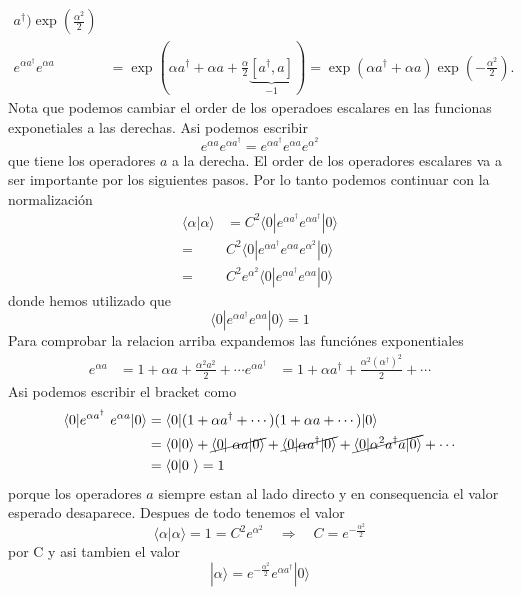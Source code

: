 \begin{solucion}
\begin{align*}
a^\dagger) \exp(\frac{\alpha^2}{2}) \\
	e^{\alpha a^\dagger} e^{\alpha a} &= \exp(\alpha a^\dagger + \alpha a +
\frac{\alpha}{2} \underbrace{[a^\dagger, a]}_{-1}) = \exp(\alpha a^\dagger +
\alpha a) \exp(-\frac{\alpha^2}{2}).
\end{align*}
Nota que podemos cambiar el order de los operadoes escalares en las funcionas
exponetiales a las derechas. Asi podemos escribir
$$
	e^{\alpha a} e^{\alpha a^\dagger} = e^{\alpha a^\dagger} e^{\alpha a}
e^{\alpha^2}
$$
que tiene los operadores $a$ a la derecha. El order de los operadores escalares
va a ser importante por los siguientes pasos. Por lo tanto podemos continuar con
la normalización
\begin{align*}
	\langle \alpha | \alpha \rangle &= C^2 \langle 0 | e^{\alpha a^\dagger}
e^{\alpha a^\dagger} | 0\rangle \\
	=& C^2 \langle 0 | e^{\alpha a^\dagger} e^{\alpha a} e^{\alpha^2} | 0\rangle
\\
	=& C^2 e^{\alpha^2} \langle 0| e^{\alpha a^\dagger} e^{\alpha a} | 0\rangle
\end{align*}
donde hemos utilizado que 
$$
	\langle 0 | e^{\alpha a^\dagger} e^{\alpha a} | 0\rangle = 1
$$
Para comprobar la relacion arriba expandemos las funciónes exponentiales
\begin{align*}
	e^{\alpha a} &= 1 + \alpha a + \frac{\alpha^2 a^2}{2} + \cdots 
	e^{\alpha a^\dagger} &= 1 + \alpha a^\dagger + \frac{\alpha^2
(\alpha^\dagger)^2}{2} + \cdots
\end{align*}
Asi podemos escribir el bracket como 
\begin{align*}
	\langle 0 | e^{\alpha a^\dagger} e^{\alpha a} | 0\rangle &= \langle 0 | ( 1 +
\alpha a^\dagger + \cdots)(1 + \alpha a + \cdots ) | 0 \rangle \\
	&= \langle 0 | 0 \rangle + \cancel{\langle 0 | \alpha a | 0 \rangle} +
\cancel{\langle 0 | \alpha a^\dagger | 0 \rangle} + \cancel{\langle 0 | \alpha^2
a^\dagger a | 0\rangle} + \cdots \\
	&= \langle 0 | 0 \rangle = 1 
\end{align*}
porque los operadores $a$ siempre estan al lado directo y en consequencia el
valor esperado desaparece. Despues de todo tenemos el valor
$$
	\langle \alpha | \alpha \rangle = 1 = C^2 e^{\alpha^2} \quad \Rightarrow
\quad C = e^{-\frac{\alpha^2}{2}}
$$
por C y asi tambien el valor
$$
	|\alpha \rangle = e^{-\frac{\alpha^2}{2}} e^{\alpha a^\dagger} | 0 \rangle
$$
\end{solucion}

